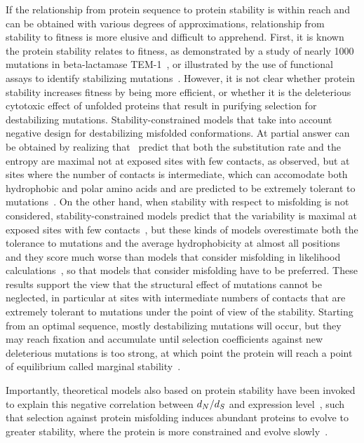 If the relationship from protein sequence to protein stability is within reach and can be obtained with various degrees of approximations, relationship from stability to fitness is more elusive and difficult to apprehend.
First, it is known the protein stability relates to fitness, as demonstrated by a study of nearly 1000 mutations in beta-lactamase TEM-1~\citep{Jacquier2013}, or illustrated by the use of functional assays to identify stabilizing mutations~\citep{Araya2012}.
However, it is not clear whether protein stability increases fitness by being more efficient, or whether it is the deleterious cytotoxic effect of unfolded proteins that result in purifying selection for destabilizing mutations.
Stability-constrained models that take into account negative design for destabilizing misfolded conformations.
At partial answer can be obtained by realizing that~\citep{Berezovsky2007, Noivirt-Brik2009, Minning2013} predict that both the \gls{substitution} rate and the entropy are maximal not at exposed sites with few contacts, as observed, but at sites where the number of contacts is intermediate, which can accomodate both hydrophobic and polar amino acids and are predicted to be extremely tolerant to mutations~\citep{Jimenez2018}.
On the other hand, when stability with respect to misfolding is not considered, stability-constrained models predict that the variability is maximal at exposed sites with few contacts~\citep{Scherrer2012,Echave2015}, but these kinds of models overestimate both the tolerance to mutations and the average hydrophobicity at almost all positions~\citep{Jimenez2018} and they score much worse than models that consider misfolding in \gls{likelihood} calculations~\citep{Arenas2015a, Arenas2017}, so that models that consider misfolding have to be preferred.
These results support the view that the structural effect of mutations cannot be neglected, in particular at sites with intermediate numbers of contacts that are extremely tolerant to mutations under the point of view of the stability.
Starting from an optimal sequence, mostly destabilizing mutations will occur, but they may reach fixation and accumulate until selection coefficients against new deleterious mutations is too strong, at which point the protein will reach a point of equilibrium called marginal stability~\citep{Taverna2002, Bloom2007}.

Importantly, theoretical models also based on protein stability have been invoked to explain this negative correlation between $d_N / d_S$ and expression level~\citep{Wilke2006, Drummond2008}, such that selection against protein misfolding induces abundant proteins to evolve to greater stability, where the protein is more constrained and evolve slowly~\citep{Serohijos2012}.


